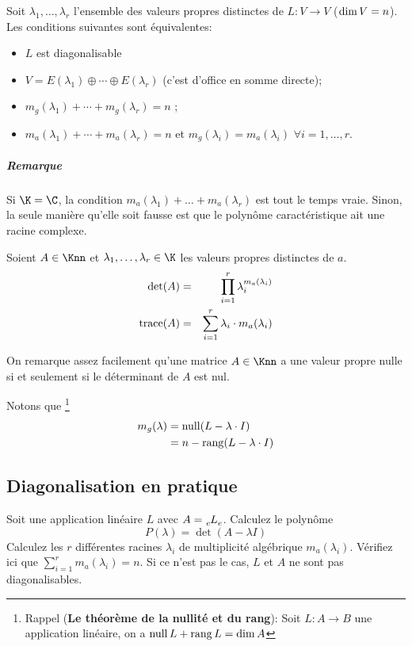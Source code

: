 \begin{myprop}
	Soit $\lambda_1 , \dots , \lambda_r$ l'ensemble des valeurs propres distinctes de $L : V \rightarrow V$ ($\operatorname{dim} V = n$).
	Les conditions suivantes sont équivalentes:
	\begin{itemize}
		\item $L$ est diagonalisable
		\item $V = E(\lambda_1) \oplus \cdots \oplus E(\lambda_r)$ (c'est d'office en somme directe);
		\item $m_g(\lambda_1) + \cdots + m_g(\lambda_r) = n$ ;
		\item $m_a (\lambda_1) + \cdots + m_a (\lambda_r) = n$ et $m_g(\lambda_i) = m_a (\lambda_i)$ $\forall i = 1, \dots, r$.
	\end{itemize}
	\subparagraph{Remarque}
	Si $\K = \C$, la condition $m_a(\lambda_1) + \dots + m_a(\lambda_r)$ est tout le temps vraie.
	Sinon, la seule manière qu'elle soit fausse est que le polynôme caractéristique ait une racine complexe.
\end{myprop}

\begin{myprop}
	Soient $A \in \Knn$ et $\lambda_1, \dots, \lambda_r \in \K$ les valeurs propres distinctes de $a$.
	\begin{eqnarray*}
		\det(A) &=& \prod_{i = 1}^{r} \lambda_i^{m_a(\lambda_i)}\\
		\operatorname{trace}(A) &=& \sum_{i = 1}^{r} \lambda_i \cdot m_a(\lambda_i)
	\end{eqnarray*}
\end{myprop}

\begin{myrem}
	On remarque assez facilement qu'une matrice $A \in \Knn$ a une valeur propre nulle si
	et seulement si le déterminant de $A$ est nul.
\end{myrem}

\begin{myrem}
	Notons que
	\footnote{Rappel ({\bf Le théorème de la nullité et du rang}):
	Soit $L:A \to B$ une application linéaire, on a $\operatorname{null} L + \operatorname{rang} L = \dim A$}
	\begin{align*}
		m_g(\lambda) & = \operatorname{null} (L - \lambda \cdot I) \\
		& = n - \operatorname{rang} (L - \lambda \cdot I)
	\end{align*}
\end{myrem}

\subsection{Diagonalisation en pratique}
Soit une application linéaire $L$ avec $A = \tensor*[_e]{L}{_e}$.
Calculez le polynôme
\[ P(\lambda) = \det \left( A - \lambda I \right) \]
Calculez les $r$ différentes racines $\lambda_i$ de multiplicité algébrique $m_a(\lambda_i)$.
Vérifiez ici que $\sum_{i=1}^r m_a(\lambda_i) = n$. Si ce n'est pas le cas, $L$ et $A$ ne sont pas diagonalisables.

